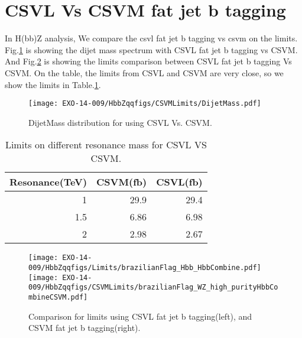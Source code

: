 \newpage
\section{CSVL Vs CSVM fat jet b tagging}
\label{app:CSVLCSVM}
In H(bb)Z analysis, We compare the csvl fat jet b tagging vs csvm on the limits. 
Fig.\ref{fig:HbbCSVMDijetMass} is showing the dijet mass spectrum with CSVL fat jet b tagging vs CSVM. 
And Fig.\ref{fig:HbbLimitsCompare} is showing the limits comparison between CSVL fat jet b tagging Vs CSVM. 
On the table, the limits from CSVL and CSVM are very close, so we show the limits in Table.\ref{table:HbbCSVM}. 


\begin{figure}[h!tpb]
\begin{center}
\texttt{[image: EXO-14-009/HbbZqqfigs/CSVMLimits/DijetMass.pdf]}
\end{center}
\caption{
DijetMass distribution for using CSVL Vs. CSVM. 
}
\label{fig:HbbCSVMDijetMass}
\end{figure}

\begin{table}[htbp]
\begin{tabular}{|r|r|r|}
\hline
\multicolumn{1}{|l|}{Resonance(TeV)} & \multicolumn{1}{l|}{CSVM(fb)} & \multicolumn{1}{l|}{CSVL(fb)} \\ \hline
1 & 29.9 & 29.4 \\ \hline
1.5 & 6.86 & 6.98 \\ \hline
2 & 2.98 & 2.67 \\ \hline
\end{tabular}
\caption{Limits on different resonance mass for CSVL VS CSVM.}
\label{table:HbbCSVM}
\end{table}


\begin{figure}[h!tpb]
\begin{center}
\texttt{[image: EXO-14-009/HbbZqqfigs/Limits/brazilianFlag\_Hbb\_HbbCombine.pdf]}
\texttt{[image: EXO-14-009/HbbZqqfigs/CSVMLimits/brazilianFlag\_WZ\_high\_purityHbbCombineCSVM.pdf]}
\end{center}
\caption{
Comparison for limits using CSVL fat jet b tagging(left), and CSVM fat jet b tagging(right). 
}
\label{fig:HbbLimitsCompare}
\end{figure}


\clearpage

